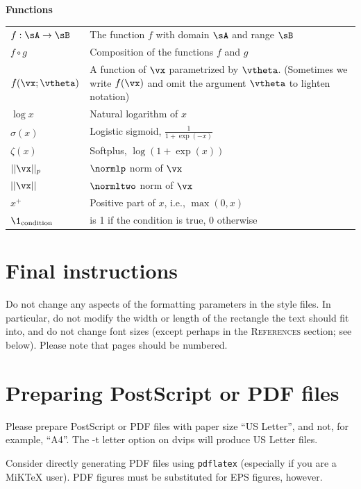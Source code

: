 \documentclass{article} %
\begin{document}
\centerline{\bf Functions}
\bgroup
\def\arraystretch{1.5}
\begin{tabular}{p{1.25in}p{3.25in}}
$\displaystyle f: \sA \rightarrow \sB$ & The function $f$ with domain $\sA$ and range $\sB$\\
$\displaystyle f \circ g $ & Composition of the functions $f$ and $g$ \\
  $\displaystyle f(\vx ; \vtheta) $ & A function of $\vx$ parametrized by $\vtheta$.
  (Sometimes we write $f(\vx)$ and omit the argument $\vtheta$ to lighten notation) \\
$\displaystyle \log x$ & Natural logarithm of $x$ \\
$\displaystyle \sigma(x)$ & Logistic sigmoid, $\displaystyle \frac{1} {1 + \exp(-x)}$ \\
$\displaystyle \zeta(x)$ & Softplus, $\log(1 + \exp(x))$ \\
$\displaystyle || \vx ||_p $ & $\normlp$ norm of $\vx$ \\
$\displaystyle || \vx || $ & $\normltwo$ norm of $\vx$ \\
$\displaystyle x^+$ & Positive part of $x$, i.e., $\max(0,x)$\\
$\displaystyle \1_\mathrm{condition}$ & is 1 if the condition is true, 0 otherwise\\
\end{tabular}
\egroup
\vspace{0.25cm}



\section{Final instructions}
Do not change any aspects of the formatting parameters in the style files.
In particular, do not modify the width or length of the rectangle the text
should fit into, and do not change font sizes (except perhaps in the
\textsc{References} section; see below). Please note that pages should be
numbered.

\section{Preparing PostScript or PDF files}

Please prepare PostScript or PDF files with paper size ``US Letter'', and
not, for example, ``A4''. The -t
letter option on dvips will produce US Letter files.

Consider directly generating PDF files using \verb+pdflatex+
(especially if you are a MiKTeX user).
PDF figures must be substituted for EPS figures, however.
\end{document}

